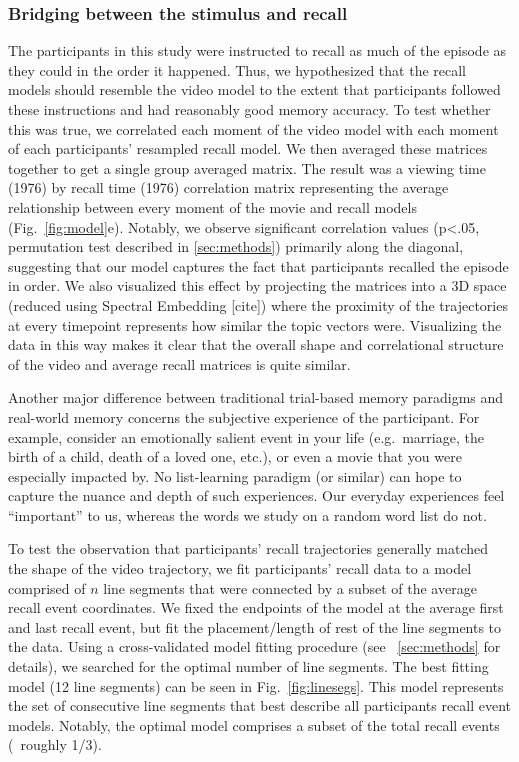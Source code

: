 \subsubsection{Bridging between the stimulus and recall}
The participants in this study were instructed to recall as much of the episode as they could in the order it happened.  Thus, we hypothesized that the recall models should resemble the video model to the extent that participants followed these instructions and had reasonably good memory accuracy. To test whether this was true, we correlated each moment of the video model with each moment of each participants' resampled recall model. We then averaged these matrices together to get a single group averaged matrix.  The result was a viewing time (1976) by recall time (1976) correlation matrix representing the average relationship between every moment of the movie and recall models (Fig.~\ref{fig:model}e). Notably, we observe significant correlation values (p<.05, permutation test described in \ref{sec:methods}) primarily along the diagonal, suggesting that our model captures the fact that participants recalled the episode in order. We also visualized this effect by projecting the matrices into a 3D space (reduced using Spectral Embedding [cite]) where the proximity of the trajectories at every timepoint represents how similar the topic vectors were. Visualizing the data in this way makes it clear that the overall shape and correlational structure of the video and average recall matrices is quite similar.

Another major difference between traditional trial-based memory paradigms and real-world memory concerns the subjective experience of the participant.  For example, consider an emotionally salient event in your life (e.g.\ marriage, the birth of a child, death of a loved one, etc.), or even a movie that you were especially impacted by.  No list-learning paradigm (or similar) can hope to capture the nuance and depth of such experiences.  Our everyday experiences feel ``important'' to us, whereas the words we study on a random word list do not.

To test the observation that participants' recall trajectories generally matched the shape of the video trajectory, we fit participants' recall data to a model comprised of $n$ line segments that were connected by a subset of the average recall event coordinates. We fixed the endpoints of the model at the average first and last recall event, but fit the placement/length of rest of the line segments to the data. Using a cross-validated model fitting procedure (see ~\ref{sec:methods} for details), we searched for the optimal number of line segments. The best fitting model (12 line segments) can be seen in Fig.~\ref{fig:linesegs}. This model represents the set of consecutive line segments that best describe all participants recall event models. Notably, the optimal model comprises a subset of the total recall events (~roughly 1/3). %

